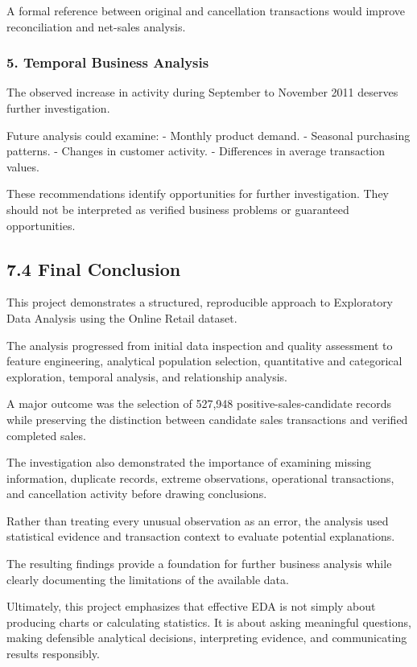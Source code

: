\documentclass[11pt]{article}
\begin{document}
A formal reference between original and cancellation transactions would
improve reconciliation and net-sales analysis.

\subsubsection{5. Temporal Business
Analysis}\label{temporal-business-analysis}

The observed increase in activity during September to November 2011
deserves further investigation.

Future analysis could examine: - Monthly product demand. - Seasonal
purchasing patterns. - Changes in customer activity. - Differences in
average transaction values.

These recommendations identify opportunities for further investigation.
They should not be interpreted as verified business problems or
guaranteed opportunities.

    \subsection{7.4 Final Conclusion}\label{final-conclusion}

This project demonstrates a structured, reproducible approach to
Exploratory Data Analysis using the Online Retail dataset.

The analysis progressed from initial data inspection and quality
assessment to feature engineering, analytical population selection,
quantitative and categorical exploration, temporal analysis, and
relationship analysis.

A major outcome was the selection of 527,948 positive-sales-candidate
records while preserving the distinction between candidate sales
transactions and verified completed sales.

The investigation also demonstrated the importance of examining missing
information, duplicate records, extreme observations, operational
transactions, and cancellation activity before drawing conclusions.

Rather than treating every unusual observation as an error, the analysis
used statistical evidence and transaction context to evaluate potential
explanations.

The resulting findings provide a foundation for further business
analysis while clearly documenting the limitations of the available
data.

Ultimately, this project emphasizes that effective EDA is not simply
about producing charts or calculating statistics. It is about asking
meaningful questions, making defensible analytical decisions,
interpreting evidence, and communicating results responsibly.
\end{document}
